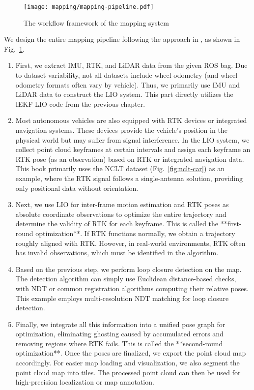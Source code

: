 \begin{figure}  
	\centering  
	\texttt{[image: mapping/mapping-pipeline.pdf]}  
	\caption{The workflow framework of the mapping system}  
	\label{fig:mapping-pipeline}  
\end{figure}  

We design the entire mapping pipeline following the approach in \cite{Gao2021}, as shown in Fig.~\ref{fig:mapping-pipeline}.  

\begin{enumerate}  
	\item First, we extract IMU, RTK, and LiDAR data from the given ROS bag. Due to dataset variability, not all datasets include wheel odometry (and wheel odometry formats often vary by vehicle). Thus, we primarily use IMU and LiDAR data to construct the LIO system. This part directly utilizes the IEKF LIO code from the previous chapter.  
	\item Most autonomous vehicles are also equipped with RTK devices or integrated navigation systems. These devices provide the vehicle's position in the physical world but may suffer from signal interference. In the LIO system, we collect point cloud keyframes at certain intervals and assign each keyframe an RTK pose (as an observation) based on RTK or integrated navigation data. This book primarily uses the NCLT dataset (Fig.~\ref{fig:nclt-car}) as an example, where the RTK signal follows a single-antenna solution, providing only positional data without orientation.  
	\item Next, we use LIO for inter-frame motion estimation and RTK poses as absolute coordinate observations to optimize the entire trajectory and determine the validity of RTK for each keyframe. This is called the **first-round optimization**. If RTK functions normally, we obtain a trajectory roughly aligned with RTK. However, in real-world environments, RTK often has invalid observations, which must be identified in the algorithm.  
	\item Based on the previous step, we perform loop closure detection on the map. The detection algorithm can simply use Euclidean distance-based checks, with NDT or common registration algorithms computing their relative poses. This example employs multi-resolution NDT matching for loop closure detection.  
	\item Finally, we integrate all this information into a unified pose graph for optimization, eliminating ghosting caused by accumulated errors and removing regions where RTK fails. This is called the **second-round optimization**. Once the poses are finalized, we export the point cloud map accordingly. For easier map loading and visualization, we also segment the point cloud map into tiles. The processed point cloud can then be used for high-precision localization or map annotation.  
\end{enumerate}  

